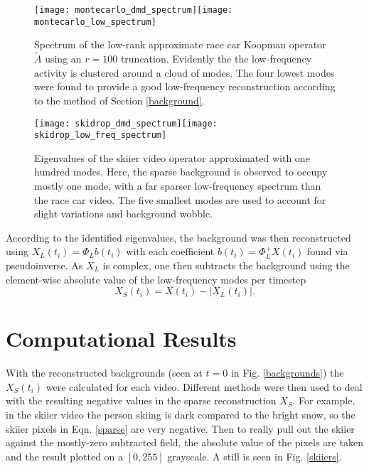 \documentclass{article}
\begin{document}
\begin{figure}[b!]
  \centering
  \texttt{[image: montecarlo\_dmd\_spectrum]}\quad\quad\quad\texttt{[image: montecarlo\_low\_spectrum]}
  \caption{Spectrum of the low-rank approximate race car Koopman operator $\widetilde{A}$ using an $r=100$ truncation. Evidently the the low-frequency activity is clustered around a cloud of modes. The four lowest modes were found to provide a good low-frequency reconstruction according to the method of Section \ref{background}.}\label{eigs_pics_mc}
\end{figure}

\begin{figure}[t!]
  \centering
  \texttt{[image: skidrop\_dmd\_spectrum]}\quad\quad\quad\texttt{[image: skidrop\_low\_freq\_spectrum]}
  \caption{Eigenvalues of the skiier video operator approximated with one hundred modes. Here, the sparse background is observed to occupy mostly one mode, with a far sparser low-frequency spectrum than the race car video. The five smallest modes are used to account for slight variations and background wobble.}\label{eigs_pics_sd}
\end{figure}

According to the identified eigenvalues, the background was then reconstructed using $X_L(t_i) = \Phi_L b(t_i)$ with each coefficient $b(t_i) = \Phi_L^+X(t_i)$ found via pseudoinverse. As $X_L$ is complex, one then subtracts the background using the element-wise absolute value of the low-frequency modes per timestep
\begin{equation}
  X_S(t_i) = X(t_i) - |X_L(t_i)|.\label{sparse}
\end{equation}

\section{Computational Results}
With the reconstructed backgrounds (seen at $t=0$ in Fig. \ref{backgrounds}) the $X_S(t_i)$ were calculated for each video. Different methods were then used to deal with the resulting negative values in the sparse reconstruction $X_S$. For example, in the skiier video the person skiing is dark compared to the bright snow, so the skiier pixels in Eqn. \ref{sparse} are very negative. Then to really pull out the skiier against the mostly-zero subtracted field, the absolute value of the pixels are taken and the result plotted on a $[0,255]$ grayscale. A still is seen in Fig. \ref{skiiers}.
\end{document}
